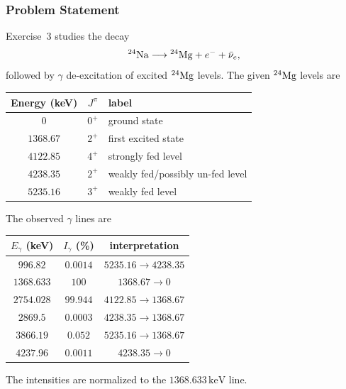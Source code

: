 \subsubsection*{Problem Statement}
Exercise~3 studies the decay
\begin{equation}
  \label{eq:lec10:na24_decay}
  \nucleus{Na}{24}\longrightarrow \nucleus{Mg}{24}+e^-+\bar\nu_e,
\end{equation}
followed by $\gamma$ de-excitation of excited $\nucleus{Mg}{24}$ levels. The
given $\nucleus{Mg}{24}$ levels are
\begin{center}
\begin{tabular}{ccl}
  Energy (keV) & $J^\pi$ & label \\
  \hline
  $0$       & $0^+$ & ground state \\
  $1368.67$ & $2^+$ & first excited state \\
  $4122.85$ & $4^+$ & strongly fed level \\
  $4238.35$ & $2^+$ & weakly fed/possibly un-fed level \\
  $5235.16$ & $3^+$ & weakly fed level
\end{tabular}
\end{center}
The observed $\gamma$ lines are
\begin{center}
\begin{tabular}{ccc}
  $E_\gamma$ (keV) & $I_\gamma$ (\%) & interpretation \\
  \hline
  $996.82$   & $0.0014$ & $5235.16\to4238.35$ \\
  $1368.633$ & $100$    & $1368.67\to0$ \\
  $2754.028$ & $99.944$ & $4122.85\to1368.67$ \\
  $2869.5$   & $0.0003$ & $4238.35\to1368.67$ \\
  $3866.19$  & $0.052$  & $5235.16\to1368.67$ \\
  $4237.96$  & $0.0011$ & $4238.35\to0$
\end{tabular}
\end{center}
The intensities are normalized to the $1368.633\,\text{keV}$ line.

